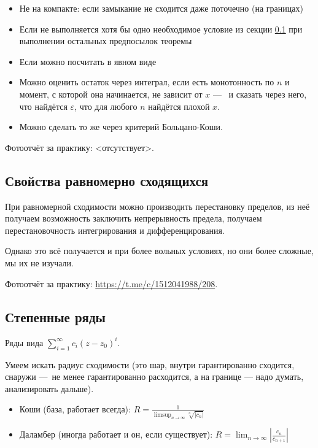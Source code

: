 \documentclass[12pt, a4paper]{article}
\begin{document}
\begin{itemize}
  \item Не на компакте: если замыкание не сходится даже поточечно (на границах)
  \item Если не выполняется хотя бы одно необходимое условие из секции \ref{Свойства равномерно сходящихся} 
  при выполнении остальных предпосылок теоремы
  \item Если можно посчитать в явном виде
  \item Можно оценить остаток через интеграл, если есть монотонность по $n$ и момент, с которой она начинается, не зависит от $x$ — 
  и сказать через него, что найдётся $\varepsilon$, что для любого $n$ найдётся плохой $x$.
  \item Можно сделать то же через критерий Больцано-Коши.
\end{itemize}



Фотоотчёт за практику: <отсутствует>.


\subsection{Свойства равномерно сходящихся}\label{Свойства равномерно сходящихся}

При равномерной сходимости можно производить перестановку пределов, 
из неё получаем возможность заключить непрерывность предела, 
получаем перестановочность интегрирования и дифференцирования.

Однако это всё получается и при более вольных условиях, но они более сложные, мы их не изучали.




Фотоотчёт за практику: \url{https://t.me/c/1512041988/208}.


\subsection{Степенные ряды}\label{Степенные ряды}

Ряды вида $\sum_{i = 1}^\infty c_i (z - z_0)^i$.

Умеем искать радиус сходимости 
(это шар, внутри гарантированно сходится, снаружи — не менее гарантированно расходится, 
а на границе — надо думать, анализировать дальше).

\begin{itemize}
  \item Коши (база, работает всегда): ${\displaystyle R = \frac{1}{\limsup_{n \to \infty} \sqrt[n]{|c_n|}}}$
  \item Даламбер (иногда работает и он, если существует): ${\displaystyle R = \lim_{n \to \infty} \left|\frac{c_{n}}{c_{n + 1}}\right|}$
\end{itemize}
\end{document}
